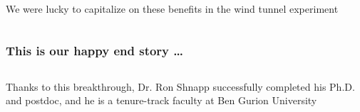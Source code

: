 \begin{frame}[label=why-12]{We were lucky to capitalize on these benefits in the wind tunnel experiment}
\begin{center}
\begin{columns}
\hfill
{}
\end{columns}
\end{center}
\end{frame}


\begin{frame}[label=why-5]
\frametitle{This is our happy end story \ldots }
\begin{columns}
    \centering {}
    \begin{cardTiny}
        Thanks to this breakthrough, Dr. Ron Shnapp successfully completed his Ph.D. and postdoc, and he is a tenure-track faculty at Ben Gurion University
    \end{cardTiny}
\end{columns}
\end{frame}






